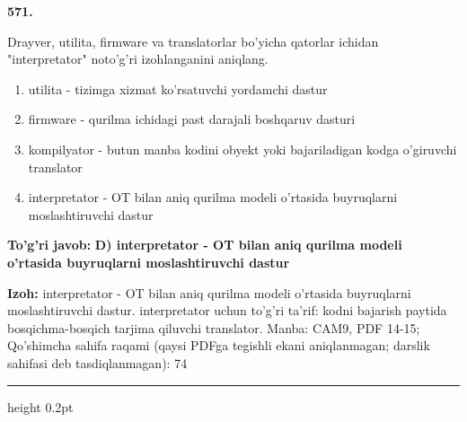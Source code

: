 \documentclass[10pt,a4paper]{article}
\begin{document}
{\bfseries\sffamily\color{ink} 571.}
\par
Drayver, utilita, firmware va translatorlar bo'yicha qatorlar ichidan "interpretator" noto'g'ri izohlanganini aniqlang.
\begin{enumerate}[label=\Alph*),leftmargin=9mm]
\item utilita - tizimga xizmat ko'rsatuvchi yordamchi dastur
\item firmware - qurilma ichidagi past darajali boshqaruv dasturi
\item kompilyator - butun manba kodini obyekt yoki bajariladigan kodga o'giruvchi translator
\item interpretator - OT bilan aniq qurilma modeli o'rtasida buyruqlarni moslashtiruvchi dastur
\end{enumerate}
\begin{tcolorbox}[enhanced,breakable,colback=teal!4,colframe=teal!60!black,boxrule=0.45pt,arc=1.2mm,left=2.7mm,right=2.7mm,top=1.8mm,bottom=1.8mm,before skip=2mm,after skip=2mm]
{\bfseries\sffamily\color{teal}To'g'ri javob:} \textbf{D) interpretator - OT bilan aniq qurilma modeli o'rtasida buyruqlarni moslashtiruvchi dastur}
\par\smallskip
{\bfseries Izoh:} interpretator - OT bilan aniq qurilma modeli o'rtasida buyruqlarni moslashtiruvchi dastur. interpretator uchun to'g'ri ta'rif: kodni bajarish paytida bosqichma-bosqich tarjima qiluvchi translator. Manba: CAM9, PDF 14-15; Qo'shimcha sahifa raqami (qaysi PDFga tegishli ekani aniqlanmagan; darslik sahifasi deb tasdiqlanmagan): 74
\end{tcolorbox}
\vspace{2mm}\hrule height 0.2pt\vspace{3mm}
\end{document}
